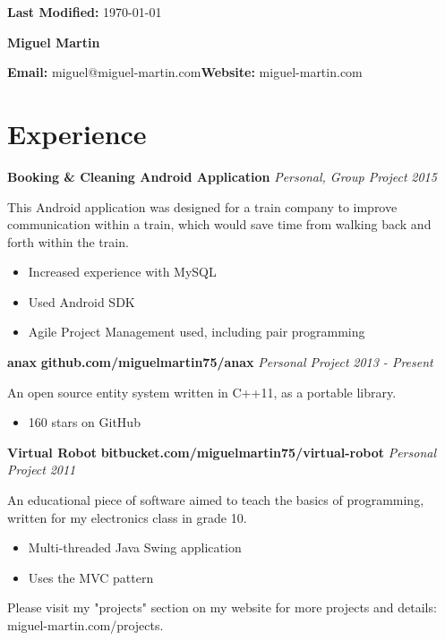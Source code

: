 \documentclass[10pt,oneside,a4paper]{article}
\newcommand{\project}[5] 
{
    {
    \textbf{#1} \hfill {\footnotesize\textbf{#2}}\newline
    \emph{#3} \hfill \emph{#4}
    }

    {
        \begin{description}[leftmargin=0.5cm, itemindent=0cm]
        \item {#5}
        \end{description}
    }
}
\newcommand{\info}[2] 
{
    {
        \section*{#1}
        \hrulefill\newline
    }

    {#2}
}
\begin{document}
{
    \raggedleft
    \footnotesize
    \textbf{Last Modified:} \today

    \centering
    {\huge\textbf{Miguel Martin}}

    \textbf{Email:} miguel@miguel-martin.com\hfill\textbf{Website:} miguel-martin.com\newline

}


\info{Experience}
{
    {
        \project{Booking \& Cleaning Android Application}{}
        {Personal, Group Project}{2015}
        {
            This Android application was designed for a train company to improve communication within a train, which would save time from walking back and forth within the train.
            \begin{itemize}
                \item Increased experience with MySQL 
                \item Used Android SDK
                \item Agile Project Management used, including pair programming
            \end{itemize}
        }
        \project{anax}{github.com/miguelmartin75/anax}
        {Personal Project}{2013 - Present}
        {
            An open source entity system written in C++11, as a portable library.
            \begin{itemize}
                \item 160 stars on GitHub
            \end{itemize}
        }
        \project{Virtual Robot}{bitbucket.com/miguelmartin75/virtual-robot}
        {Personal Project}{2011}
        {
            An educational piece of software aimed to teach the basics of programming,
            written for my electronics class in grade 10.
            \begin{itemize}
                \item Multi-threaded Java Swing application
                \item Uses the MVC pattern
            \end{itemize}
        }
        Please visit my "projects" section on my website for more projects and details: miguel-martin.com/projects.
    }
}
\end{document}

